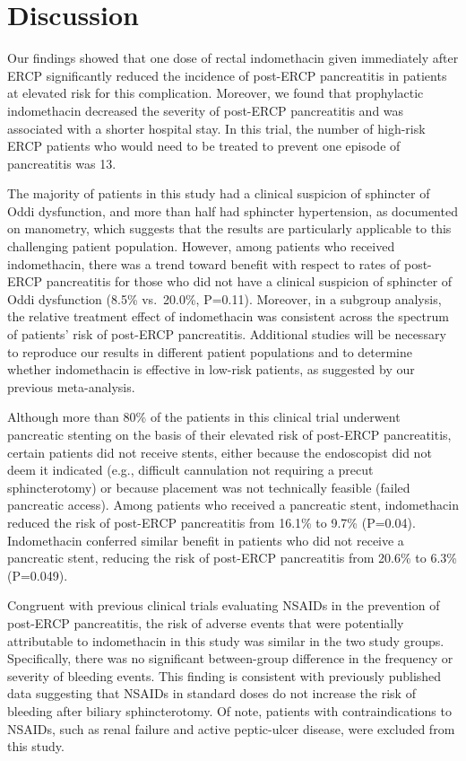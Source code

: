 \documentclass[
  10pt,
  letterpaper,
]{article}
\begin{document}
\section{Discussion}\label{discussion}

Our findings showed that one dose of rectal indomethacin given
immediately after ERCP significantly reduced the incidence of post-ERCP
pancreatitis in patients at elevated risk for this complication.
Moreover, we found that prophylactic indomethacin decreased the severity
of post-ERCP pancreatitis and was associated with a shorter hospital
stay. In this trial, the number of high-risk ERCP patients who would
need to be treated to prevent one episode of pancreatitis was 13.

The majority of patients in this study had a clinical suspicion of
sphincter of Oddi dysfunction, and more than half had sphincter
hypertension, as documented on manometry, which suggests that the
results are particularly applicable to this challenging patient
population. However, among patients who received indomethacin, there was
a trend toward benefit with respect to rates of post-ERCP pancreatitis
for those who did not have a clinical suspicion of sphincter of Oddi
dysfunction (8.5\% vs.~20.0\%, P=0.11). Moreover, in a subgroup
analysis, the relative treatment effect of indomethacin was consistent
across the spectrum of patients' risk of post-ERCP pancreatitis.
Additional studies will be necessary to reproduce our results in
different patient populations and to determine whether indomethacin is
effective in low-risk patients, as suggested by our previous
meta-analysis.\citep{andriulli2007}

Although more than 80\% of the patients in this clinical trial underwent
pancreatic stenting on the basis of their elevated risk of post-ERCP
pancreatitis, certain patients did not receive stents, either because
the endoscopist did not deem it indicated (e.g., difficult cannulation
not requiring a precut sphincterotomy) or because placement was not
technically feasible (failed pancreatic access). Among patients who
received a pancreatic stent, indomethacin reduced the risk of post-ERCP
pancreatitis from 16.1\% to 9.7\% (P=0.04). Indomethacin conferred
similar benefit in patients who did not receive a pancreatic stent,
reducing the risk of post-ERCP pancreatitis from 20.6\% to 6.3\%
(P=0.049).

Congruent with previous clinical trials evaluating NSAIDs in the
prevention of post-ERCP pancreatitis, the risk of adverse events that
were potentially attributable to indomethacin in this study was similar
in the two study groups. Specifically, there was no significant
between-group difference in the frequency or severity of bleeding
events. This finding is consistent with previously published data
suggesting that NSAIDs in standard doses do not increase the risk of
bleeding after biliary
sphincterotomy.\citep{freeman1996, nelson1994major} Of note, patients
with contraindications to NSAIDs, such as renal failure and active
peptic-ulcer disease, were excluded from this study.
\end{document}
